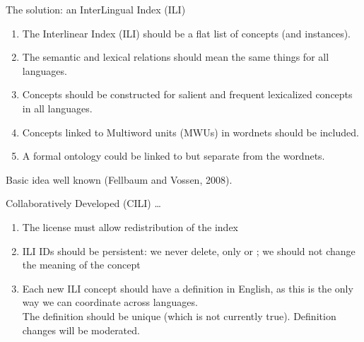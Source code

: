 \documentclass{beamer}
\begin{document}
\begin{frame}{The solution: an InterLingual Index (ILI)}
\begin{enumerate}
\item The Interlinear Index (ILI) should be a flat list of concepts (and instances).
\item\label{ili:links} The semantic and lexical relations should mean the same things for all languages.
\item Concepts should be constructed for salient and frequent lexicalized
  concepts in all languages.
\item Concepts linked to Multiword units (MWUs) in wordnets should be included.  
\item A formal ontology could be linked to but separate from the wordnets.
\end{enumerate}

Basic idea well known (Fellbaum and Vossen, 2008). 
\end{frame}

\begin{frame}{Collaboratively Developed (CILI) \ldots}
\begin{enumerate}
\item\label{license} The license must allow redistribution of the index
\item\label{persistent} ILI IDs should be persistent:
 we never delete, only  or ;
  we should not change the meaning of the concept
\item\label{defs} Each new ILI concept should have a definition in English, as
 this is the only way we can coordinate across languages.
\\
The definition should be unique (which is not currently true).
  Definition changes will be moderated.
\end{enumerate}
\end{frame}
\end{document}
